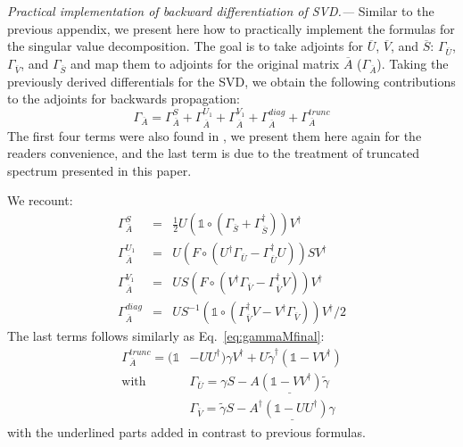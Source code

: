 \documentclass[twocolumn,floatfix,superscriptaddress,longbibliography,pra]{revtex4-2}
\renewcommand{\section}[1]{\emph{#1.---}}
\begin{document}
\section{Practical implementation of backward differentiation of SVD}
Similar to the previous appendix, we present here how to practically implement the formulas for the singular value decomposition. The goal is to take adjoints for $\overline{U}$, $\overline{V}$, and $\overline{S}$: $\Gamma_{\overline{U}}$, $\Gamma_{\overline{V}}$, and $\Gamma_{\overline{S}}$ and map them to adjoints for the original matrix $\overline{A}$ ($\Gamma_{\overline{A}}$).
Taking the previously derived differentials for the SVD, we obtain the following contributions to the adjoints for backwards propagation:
\begin{equation}
  \Gamma_{\overline{A}}=\Gamma_{\overline{A}}^{S}+\Gamma_{\overline{A}}^{U_1}+\Gamma_{\overline{A}}^{V_1}+\Gamma_{\overline{A}}^{diag}+\Gamma_{\overline{A}}^{trunc}  
\end{equation}
The first four terms were also found in \cite{complexSVD}, we present them here again for the readers convenience, and the last term is due to the treatment of truncated spectrum presented in this paper.

We recount:
\begin{eqnarray}
    \Gamma^S_{\overline{A}}&=&\frac{1}{2}U\left(\mathbb{1}\circ(\Gamma_{\overline{S}}+\Gamma_{\overline{S}}^\dagger)\right)V^\dagger\\
    \Gamma^{U_1}_{\overline{A}}&=&U\left(F\circ (U^\dagger\Gamma_{\overline{U}} - \Gamma_{\overline{U}}^\dagger U)\right)SV^\dagger\\
    \Gamma^{V_1}_{\overline{A}}&=&US\left(F\circ (V^\dagger\Gamma_{\overline{V}} - \Gamma_{\overline{V}}^\dagger V)\right)V^\dagger\\ %
    \Gamma^{diag}_{\overline{A}}&=& US^{-1}\left(\mathbb{1}\circ (\Gamma_{\overline{V}}^\dagger V - V^\dagger\Gamma_{\overline{V}})\right) V^\dagger/2
\end{eqnarray}
The last terms follows similarly as Eq.~\eqref{eq:gammaMfinal}:
\begin{equation}
\begin{split}
\Gamma_{\overline{A}}^{trunc} = (\mathbb{1}&-UU^\dagger)\gamma V^\dagger + U\tilde{\gamma}^\dagger(\mathbb{1}-VV^\dagger)\\
  \text{with}\qquad& \Gamma_{\overline{U}}=\gamma S - \underline{A(\mathbb{1}-VV^\dagger)\tilde{\gamma}} \\
  & \Gamma_{\overline{V}} =\tilde{\gamma}S - \underline{A^\dagger(\mathbb{1}-UU^\dagger)\gamma}
\end{split}
\end{equation}
  with the underlined parts added in contrast to previous formulas. 



\end{document}
